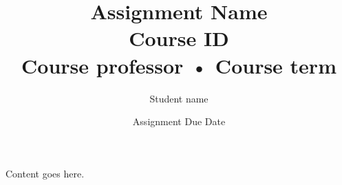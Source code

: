 \documentclass[letterpaper, 12pt]{article}
\newcommand{\noteCourseId}{Course ID}
\newcommand{\noteCourseProfessor}{Course professor}
\newcommand{\noteAuthor}{Student name}
\newcommand{\noteTerm}{Course term}
\begin{document}

\title{Assignment Name \\[0.25em]
	\normalsize\noteCourseId{} \\[1em]
	\noteCourseProfessor{} • \noteTerm{}}


\author{\normalsize\noteAuthor{}}
\date{\vspace{-1em} \normalsize Assignment Due Date}


\maketitle


Content goes here.

\end{document}
